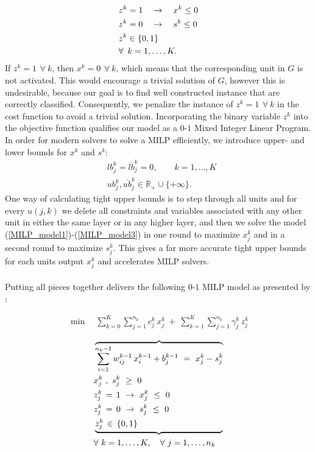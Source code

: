 \documentclass{article}
\begin{document}
\begin{align}
&z^k = 1 \quad \rightarrow \quad x^k \leq 0 \notag \\
&z^k = 0 \quad \rightarrow \quad s^k \leq 0 \notag \\
&z^k \in \{0,1\} \notag \\
&\forall \ \, k=1, \ldots, K. \notag
\end{align}
If $z^k=1 \ \, \forall \ k$, then $x^k=0 \ \, \forall \ k$, which means that the corresponding unit in $G$ is not activated. This would encourage a trivial solution of $G$, however this is undesirable, because our goal is to find well constructed instance that are correctly classified. Consequently, we penalize the instance of $z^k=1 \ \, \forall \ k$ in the cost function to avoid a trivial solution. Incorporating the binary variable $z^k$ into the objective function qualifies our model as a $0$-$1$ Mixed Integer Linear Program.\\
In order for modern solvers to solve a MILP efficiently, we introduce upper- and lower bounds for $x^k$ and $s^k$:
\begin{align}
&lb^k_j = \overline{lb}_j^k = 0, \qquad k=1, \ldots, K \\
&ub_j^k, \overline{ub}^k_j \in \mathbb{R}_+ \cup \{+\infty\}. 
\end{align}
One way of calculating tight upper bounds is to step through all units and for every $u(j,k)$ we delete all constraints and variables associated with any other unit in either the same layer or in any higher layer, and then we solve the model (\ref{MILP_model1})-(\ref{MILP_model3}) in one round to maximize $x_j^k$ and in a second round to maximize $s_j^k$. This gives a far more accurate tight upper bounds for each units output $x_j^k$ and accelerates MILP solvers.\\
\\
Putting all pieces together delivers the following $0$-$1$ MILP model as presented by \citep{fischetti17}:


\begin{align} 
\min \quad \sum_{k=0}^K \sum_{j=1}^{n_k} c^k_j \, x^k_j \ + \ \sum_{k=1}^K \sum_{j=1}^{n_k} \gamma^k_j \, z^k_j \label{MILP_model1}
\end{align}

\begin{align} 
&\overbrace{ 
\sum_{i=1}^{n_k -1} w_{ij}^{k-1}\,  x_i^{k-1} + b_j^{k-1} \ = \ x_j^k - s_j^k }  \notag \\
&x_j^k \ , \ s_j^k \ \geq \ 0 \notag \\
&z_j^k \, = \, 1  \ \to \ x_j^k \ \leq \ 0 \notag\\ 
&z_j^k \, = \, 0 \ \to \ s_j^k \ \leq \ 0  \notag\\
&\underbrace{ z_j^k \, \in \, \{0,1\} \notag \qquad \qquad \qquad \qquad \qquad } \\
&\forall \ k=1, \ldots, K, \quad  \forall \ j=1, \ldots, n_k \label{MILP_model2}
\end{align}
\end{document}
